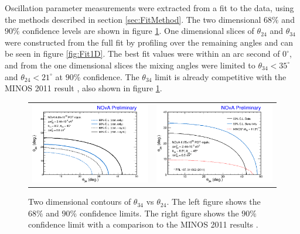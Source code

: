 Oscillation parameter measurements were extracted from a fit to the data, using the methods described in section \ref{sec:FitMethod}. The two dimensional $68\%$ and $90\%$ confidence levels are shown in figure \ref{fig:Fit2D}. One dimensional slices of $\theta_{24}$ and $\theta_{34}$ were constructed from the full fit by profiling over the remaining angles and can be seen in figure \ref{fig:Fit1D}. The best fit values were within an arc second of $0^\circ$, and from the one dimensional slices the mixing angles were limited to $\theta_{34} < 35^\circ$ and $\theta_{24} < 21^\circ$ at $90\%$ confidence. The $\theta_{34}$ limit is already competitive with the MINOS 2011 result \cite{ref:MINOSSterile}, also shown in figure \ref{fig:Fit2D}.
\begin{figure}[htbp]
  \centering
  \begin{tabular}{c c}
    \includegraphics[width=.47\textwidth]{figures/Fits/2D3424.png} &
    \includegraphics[width=.47\textwidth]{figures/Fits/2D3424_MINOS.png} \\
  \end{tabular}
  \caption[Two Dimensional $\theta_{34}$ vs $\theta_{24}$ Contours]{Two dimensional contours of $\theta_{34}$ vs $\theta_{24}$. The left figure shows the $68\%$ and $90\%$ confidence limits. The right figure shows the $90\%$ confidence limit with a comparison to the MINOS 2011 results \cite{ref:MINOSSterile}.}
  \label{fig:Fit2D}
\end{figure}

